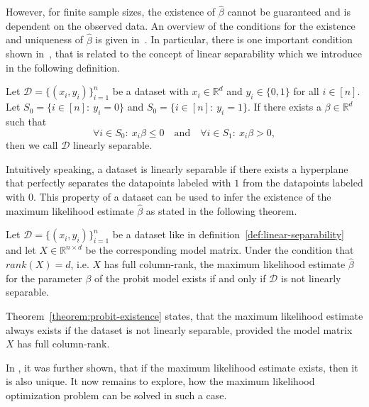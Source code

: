 However, for finite sample sizes, the existence of $\hat{\beta}$
cannot be guaranteed and is dependent on the observed data.
An overview of the conditions for the existence and uniqueness of
$\hat{\beta}$ is given in~\cite{probit-computational}.
In particular, there is one important condition shown
in~\cite{probit-existence}, that is related to the concept of
linear separability which we introduce in the following definition.
\begin{definition}
    \label{def:linear-separability}
    Let $\mathcal{D}=\{(x_i, y_i)\}_{i=1}^n$ be a dataset with
    $x_i \in \mathbb{R}^d$ and $y_i \in \{0, 1\}$ for all $i \in [n]$.
    Let $S_0 = \{i \in [n]:\ y_i = 0\}$ and $S_0 = \{i \in [n]:\ y_i = 1\}$.
    If there exists a $\beta \in \mathbb{R}^d$ such that
    \begin{equation*}
        \forall i \in S_0:\ x_i \beta \leq 0\quad \text{and}\quad \forall i \in S_1:\ x_i \beta > 0,
    \end{equation*}
    then we call $\mathcal{D}$ linearly separable.
\end{definition}

\noindent Intuitively speaking, a dataset is linearly separable if there
exists a hyperplane that perfectly separates the datapoints labeled
with $1$ from the datapoints labeled with $0$.
This property of a dataset can be used to infer the existence of the
maximum likelihood estimate $\hat{\beta}$ as stated in the following
theorem.

\begin{theorem}
    \label{theorem:probit-existence}
    Let $\mathcal{D}=\{(x_i, y_i)\}_{i=1}^n$ be a dataset like in
    definition~\ref{def:linear-separability} and let
    $X \in \mathbb{R}^{n \times d}$ be the corresponding model matrix.
    Under the condition that $rank(X)=d$, i.e. $X$ has full column-rank,
    the maximum likelihood estimate $\hat{\beta}$ for the
    parameter $\beta$ of the probit model
    exists if and only if $\mathcal{D}$ is not linearly separable.
\end{theorem}

\noindent Theorem~\ref{theorem:probit-existence} states,
that the maximum likelihood estimate always exists if the dataset
is not linearly separable, provided the model matrix $X$ has
full column-rank.

\noindent In \cite{wedderburn}, it was further shown, that if the maximum likelihood
estimate exists, then it is also unique.
It now remains to explore, how the maximum likelihood optimization
problem can be solved in such a case.


